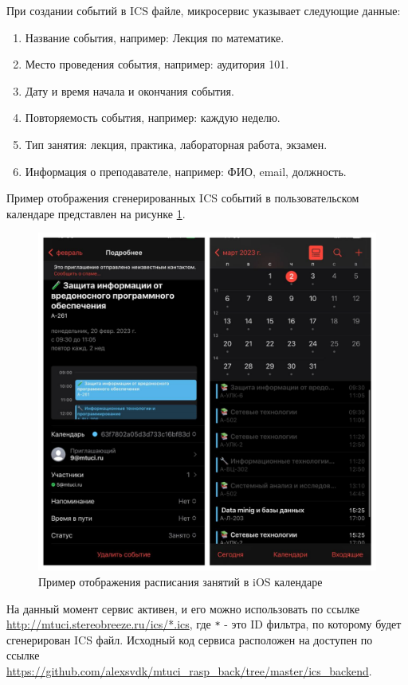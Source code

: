 При создании событий в ICS файле, микросервис указывает следующие данные:
\begin{enumerate}
  \item Название события, например: Лекция по математике.
  \item Место проведения события, например: аудитория 101.
  \item Дату и время начала и окончания события.
  \item Повторяемость события, например: каждую неделю.
  \item Тип занятия: лекция, практика, лабораторная работа, экзамен.
  \item Информация о преподавателе, например: ФИО, email, должность.
\end{enumerate}
Пример отображения сгенерированных ICS событий в пользовательском календаре представлен на рисунке \ref{fig:back:ics}.

\begin{figure}
  \centering
  \includegraphics[width=0.8\linewidth]{images/back/ics.png}
  \caption{Пример отображения расписания занятий в iOS календаре}
  \label{fig:back:ics}
\end{figure}


На данный момент сервис активен, и его можно использовать по ссылке \url{http://mtuci.stereobreeze.ru/ics/*.ics}, 
где \texttt{*} - это ID фильтра, по которому будет сгенерирован ICS файл.
Исходный код сервиса расположен на доступен по ссылке \url{https://github.com/alexsvdk/mtuci_rasp_back/tree/master/ics_backend}.

